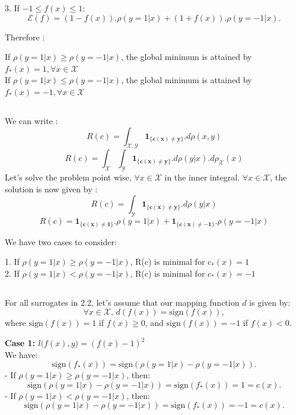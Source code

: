 \documentclass[final,3p,times,12pt]{article}
\begin{document}
3. If \(-1 \leq f(x) \leq 1\):
   \[
   \mathcal{E}(f) = (1 - f(x)).\rho(y=1|x) + (1 + f(x)).\rho(y=-1|x).
   \]


Therefore :
\begin{center}
   If $\rho(y=1|x) \geq \rho(y=-1|x)$, the global minimum is attained by $f_*(x) = 1, \forall x \in \mathcal{X}$\\
   If $\rho(y=1|x) \leq \rho(y=-1|x)$, the global minimum is attained by $f_*(x) = -1,\forall x \in \mathcal{X}$\\ 
\end{center}

\subsection{}
We can write : 
   \[
   R(c) = \int_{\mathcal{X,Y}} \mathbf{1_{\{c(x)\neq y\}}}.d\rho(x,y)
   \]
    \[
   R(c) = \int_{\mathcal{X}}\int_{\mathcal{Y}} \mathbf{1_{\{c(x)\neq y\}}}.d\rho(y|x).d\rho_{\mathcal{X}}(x)
   \]
Let's solve the problem point wise, $\forall x \in \mathcal{X}$ in the inner integral. $\forall x \in \mathcal{X}$, the solution is now given by : 
    \[
   R(c) = \int_{\mathcal{Y}} \mathbf{1_{\{c(x)\neq y\}}}.d\rho(y|x)
   \]
    \[
   R(c) = \mathbf{1_{\{c(x)\neq 1\}}}.\rho(y=1|x) + \mathbf{1_{\{c(x)\neq -1\}}}.\rho(y=-1|x)
   \]

We have two cases to consider:
\begin{center}
1. If \(\rho(y=1|x) \geq \rho(y=-1|x)\), R(c) is minimal for $c_*(x)=1$\\
2. If \(\rho(y=1|x) < \rho(y=-1|x)\), R(c) is minimal for $c_*(x)=-1$
\end{center}

\subsection{}

For all surrogates in 2.2, let's assume that our mapping function \(d\) is given by:  
\[
\forall x \in \mathcal{X}, \, d(f(x)) = \mathrm{sign}(f(x)),
\]
where \(\mathrm{sign}(f(x)) = 1\) if \(f(x) \geq 0\), and \(\mathrm{sign}(f(x)) = -1\) if \(f(x) < 0\).

\textbf{ Case 1: \(l\big(f(x),y\big) = (f(x)-1)^2\) }\\
We have:
\[
\mathrm{sign}(f_*(x)) = \mathrm{sign}(\rho(y=1|x) - \rho(y=-1|x)).
\]
- If \(\rho(y=1|x) \geq \rho(y=-1|x)\), then:
  \[
  \mathrm{sign}(\rho(y=1|x) - \rho(y=-1|x)) = \mathrm{sign}(f_*(x)) = 1 = c(x).
  \]
- If \(\rho(y=1|x) < \rho(y=-1|x)\), then:
  \[
  \mathrm{sign}(\rho(y=1|x) - \rho(y=-1|x)) = \mathrm{sign}(f_*(x)) = -1 = c(x).
  \]
\end{document}
